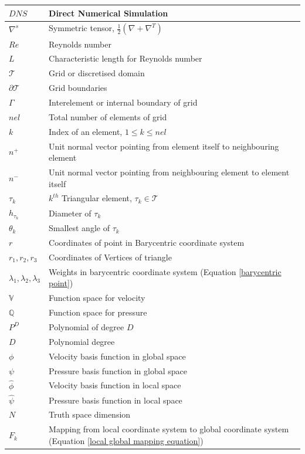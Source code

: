 \documentclass[a4paper]{book}
\begin{document}
\begin{longtable}{| p{} | p{} |}
\hline
$DNS$ & Direct Numerical Simulation\\
\hline
$\nabla^s$ & Symmetric tensor, $\frac{1}{2} (\nabla + \nabla^T)$\\
\hline
$Re$ & Reynolds number\\
\hline
$L$ & Characteristic length for Reynolds number\\
\hline
$\mathcal{T}$ & Grid or discretised domain\\
\hline
$\partial \mathcal{T}$ & Grid boundaries\\
\hline
$\Gamma$ & Interelement or internal boundary of grid\\
\hline
$nel$ & Total number of elements of grid\\
\hline
$k$ & Index of an element, $1\leq k \leq nel$\\
\hline
$n^+$ & Unit normal vector pointing from element itself to neighbouring element\\
\hline
$n^-$ & Unit normal vector pointing from neighbouring element to element itself \\
\hline
$\tau_k$ & $k^{th}$ Triangular element, $\tau_k \in \mathcal{T}$\\
\hline
$h_{\tau_k}$ & Diameter of $\tau_k$\\
\hline
$\theta_k$ & Smallest angle of $\tau_k$\\ 
\hline
$r$ & Coordinates of point in Barycentric coordinate system\\
\hline
$r_1, r_2, r_3$ & Coordinates of Vertices of triangle\\
\hline
$\lambda_1, \lambda_2, \lambda_3$ & Weights in barycentric coordinate system (Equation \ref{barycentric point})\\
\hline
$\mathbb{V}$ & Function space for velocity\\
\hline
$\mathbb{Q}$ & Function space for pressure\\
\hline
$P^D$ & Polynomial of degree $D$\\
\hline
$D$ & Polynomial degree\\
\hline
$\phi$ & Velocity basis function in global space\\
\hline
$\psi$ & Pressure basis function in global space\\
\hline
$\hat{\phi}$ & Velocity basis function in local space\\
\hline
$\hat{\psi}$ & Pressure basis function in local space\\
\hline
$N$ & Truth space dimension\\
\hline
$F_k$ & Mapping from local coordinate system to global coordinate system (Equation \ref{local global mapping equation})\\

\end{longtable}
\end{document}
